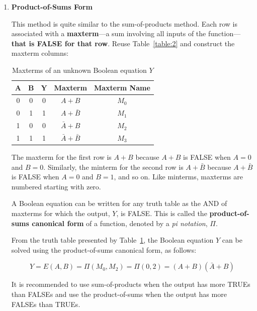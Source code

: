 \documentclass[12pt]{article}
\begin{document}
\begin{enumerate}
    \item \textbf{Product-of-Sums Form}

    This method is quite similar to the sum-of-products method. Each row is associated with a \textbf{maxterm}---a sum involving all inputs of the function---\textbf{that is FALSE for that row}. Reuse Table~\ref{table:2} and construct the maxterm columns:

    \begin{table}[h]
        \centering
        \begin{tabular}{ | c | c | c | c | c | }
        \hline \rule{0em}{1em}
        $\mathbf{A}$ & $\mathbf{B}$ & $\mathbf{Y}$ & \textbf{Maxterm}    & \textbf{Maxterm Name} \\ \hline \rule{0em}{1em}
        0            & 0            & 0            & $A + B$             & $M_0$                 \\ \hline \rule{0em}{1em}
        0            & 1            & 1            & $A + \bar{B}$       & $M_1$                 \\ \hline \rule{0em}{1em}
        1            & 0            & 0            & $\bar{A} + B$       & $M_2$                 \\ \hline \rule{0em}{1em}
        1            & 1            & 1            & $\bar{A} + \bar{B}$ & $M_3$                 \\ \hline
        \end{tabular}
        \caption{Maxterms of an unknown Boolean equation $Y$}
        \label{table:3}
    \end{table}

    The maxterm for the first row is $A + B$ because $A + B$ is FALSE when $A = 0$ and $B = 0$. Similarly, the minterm for the second row is $A + \bar{B}$ because $A + \bar{B}$ is FALSE when $A = 0$ and $B = 1$, and so on. Like minterms, maxterms are numbered starting with zero.

    A Boolean equation can be written for any truth table as the AND of maxterms for which the output, $Y$, is FALSE. This is called the \textbf{product-of-sums canonical form} of a function, denoted by a \textit{pi notation}, $\Pi$.

    From the truth table presented by Table~\ref{table:3}, the Boolean equation $Y$ can be solved using the product-of-sums canonical form, as follows:

    \begin{equation} \label{equation:4}
        Y = E(A, B) = \Pi(M_0, M_2) = \Pi(0, 2) = (A + B)(\bar{A} + B)
    \end{equation}

    It is recommended to use sum-of-products when the output has more TRUEs than FALSEs and use the product-of-sums when the output has more FALSEs than TRUEs.
\end{enumerate}
\end{document}
